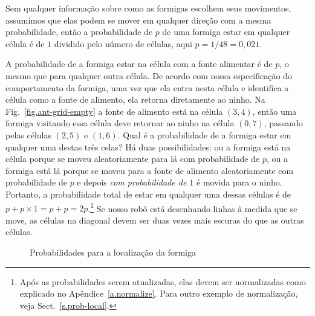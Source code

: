 Sem qualquer informação sobre como as formigas escolhem seus movimentos, assumimos que elas podem se mover em qualquer direção com a mesma probabilidade, então a probabilidade de $p$ de uma formiga estar em qualquer célula é de $1$ dividido pelo número de células, aqui $p=1/48=0,021$.

A probabilidade de a formiga estar na célula com a fonte alimentar é de $p$, o mesmo que para qualquer outra célula. De acordo com nossa especificação do comportamento da formiga, uma vez que ela entra nesta célula e identifica a célula como a fonte de alimento, ela retorna diretamente ao ninho. Na Fig.~\ref{fig.ant-grid-empty} a fonte de alimento está na célula $(3,4)$, então uma formiga visitando essa célula deve retornar ao ninho na célula $(0,7)$, passando pelas células $(2,5)$ e $(1,6)$. Qual é a probabilidade de a formiga estar em qualquer uma destas três celas? Há duas possibilidades: ou a formiga está na célula porque se moveu aleatoriamente para lá com probabilidade de $p$, ou a formiga está lá porque se moveu para a fonte de alimento aleatoriamente com probabilidade de $p$ e depois \emph{com probabilidade de $1$} é movida para o ninho. Portanto, a probabilidade total de estar em qualquer uma dessas células é de $p+p\times 1=p+p=2p$.\footnote{Após as probabilidades serem atualizadas, elas devem ser normalizadas como explicado no Apêndice~\ref{a.normalize}. Para outro exemplo de normalização, veja Sect.~\ref{s.prob-local}.}  Se nosso robô está desenhando linhas à medida que se move, as células na diagonal devem ser duas vezes mais escuras do que as outras células.

\begin{figure}
\begin{center}
\end{center}
\caption{Probabilidades para a localização da formiga}\label{fig.ant-grid-prob}
\end{figure}

